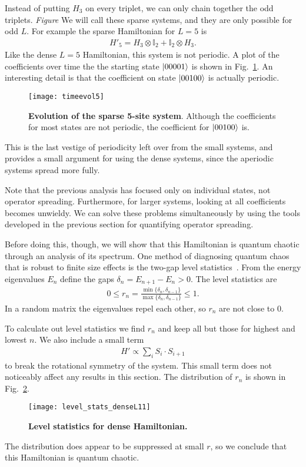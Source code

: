Instead of putting $H_3$ on every triplet, we can only chain together the odd triplets. \emph{Figure} We will call these sparse systems, and they are only possible for odd $L$. For example the sparse Hamiltonian for $L=5$ is
\begin{align}
H'_5 = H_3\otimes\mathbb{I}_2 + \mathbb{I}_2\otimes H_3.
\end{align}
Like the dense $L=5$ Hamiltonian, this system is not periodic. A plot of the coefficients over time the the starting state $\left|00001\right\rangle$ is shown in Fig.~\ref{fig:timeevol5}. An interesting detail is that the coefficient on state $\left|00100\right\rangle$ is actually periodic. 
\begin{figure}
	\centering
	\texttt{[image: timeevol5]}
	\caption{\textbf{Evolution of the sparse 5-site system}. Although the coefficients for most states are not periodic, the coefficient for $\left|00100\right\rangle$ is.}
	\label{fig:timeevol5}
\end{figure} 
This is the last vestige of periodicity left over from the small systems, and provides a small argument for using the dense systems, since the aperiodic systems spread more fully.

Note that the previous analysis has focused only on individual states, not operator spreading. Furthermore, for larger systems, looking at all coefficients becomes unwieldy. We can solve these problems simultaneously by using the tools developed in the previous section for quantifying operator spreading.

Before doing this, though, we will show that this Hamiltonian is quantum chaotic through an analysis of its spectrum. One method of diagnosing quantum chaos that is robust to finite size effects is the two-gap level statistics~\cite{Oganesyan2007}. From the energy eigenvalues $E_n$ define the gaps $\delta_n= E_{n+1}-E_n>0$. The level statistics are
\begin{align}
0\le r_n=\frac{\min\{\delta_n,\delta_{n-1}\}}{\max\{\delta_n,\delta_{n-1}\}}
	\le1.\label{eqn:levelstats}
\end{align}
In a random matrix the eigenvalues repel each other, so $r_n$ are not close to 0.

To calculate out level statistics we find $r_n$ and keep all but those for highest and lowest $n$. We also include a small term  
\begin{align}
H'\propto\sum_i S_i\cdot S_{i+1}
\end{align}
to break the rotational symmetry of the system. This small term does not noticeably affect any results in this section. The distribution of $r_n$ is shown in Fig.~\ref{fig:level_stats_denseL11}.
\begin{figure}
	\centering
	\texttt{[image: level\_stats\_denseL11]}
	\caption{\textbf{Level statistics for dense Hamiltonian.}}
	\label{fig:level_stats_denseL11}
\end{figure}
The distribution does appear to be suppressed at small $r$, so we conclude that this Hamiltonian is quantum chaotic.

